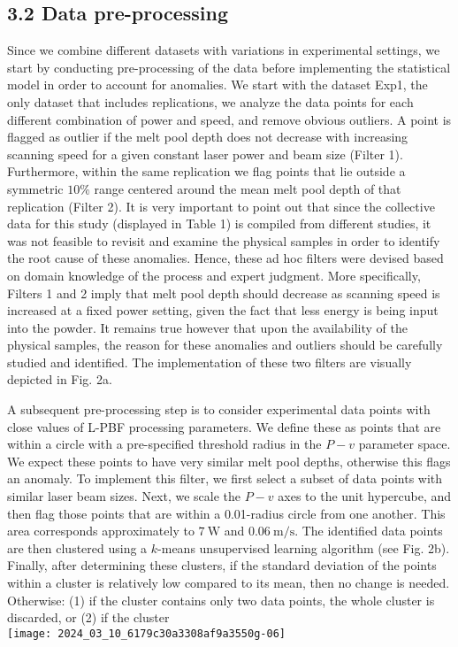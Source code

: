 \documentclass[10pt]{article}
\begin{document}
\subsection*{3.2 Data pre-processing}
Since we combine different datasets with variations in experimental settings, we start by conducting pre-processing of the data before implementing the statistical model in order to account for anomalies. We start with the dataset Exp1, the only dataset that includes replications, we analyze the data points for each different combination of power and speed, and remove obvious outliers. A point is flagged as outlier if the melt pool depth does not decrease with increasing scanning speed for a given constant laser power and beam size (Filter 1). Furthermore, within the same replication we flag points that lie outside a symmetric $10 \%$ range centered around the mean melt pool depth of that replication (Filter 2). It is very important to point out that since the collective data for this study (displayed in Table 1) is compiled from different studies, it was not feasible to revisit and examine the physical samples in order to identify the root cause of these anomalies. Hence, these ad hoc filters were devised based on domain knowledge of the process and expert judgment. More specifically, Filters 1 and 2 imply that melt pool depth should decrease as scanning speed is increased at a fixed power setting, given the fact that less energy is being input into the powder. It remains true however that upon the availability of the physical samples, the reason for these anomalies and outliers should be carefully studied and identified. The implementation of these two filters are visually depicted in Fig. 2a.

A subsequent pre-processing step is to consider experimental data points with close values of L-PBF processing parameters. We define these as points that are within a circle with a pre-specified threshold radius in the $P-v$ parameter space. We expect these points to have very similar melt pool depths, otherwise this flags an anomaly. To implement this filter, we first select a subset of data points with similar laser beam sizes. Next, we scale the $P-v$ axes to the unit hypercube, and then flag those points that are within a 0.01-radius circle from one another. This area corresponds approximately to $7 \mathrm{~W}$ and $0.06 \mathrm{~m} / \mathrm{s}$. The identified data points are then clustered using a $k$-means unsupervised learning algorithm (see Fig. 2b). Finally, after determining these clusters, if the standard deviation of the points within a cluster is relatively low compared to its mean, then no change is needed. Otherwise: (1) if the cluster contains only two data points, the whole cluster is discarded, or (2) if the cluster\\
\texttt{[image: 2024\_03\_10\_6179c30a3308af9a3550g-06]}
\end{document}
